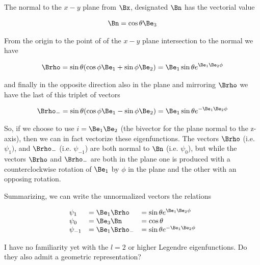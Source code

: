 The normal to the $x-y$ plane from $\Bx$, designated $\Bn$ has the vectorial value

\begin{align}\label{eqn:foo3}
\Bn = \cos\theta \Be_3 
\end{align}

From the origin to the point of of the $x-y$ plane intersection to the normal we have

\begin{align}\label{eqn:foo4}
\Brho = \sin\theta (\cos\phi \Be_1 + \sin\phi \Be_2) = \Be_1 \sin\theta e^{\Be_1 \Be_2 \phi}
\end{align}

and finally in the opposite direction also in the plane and mirroring $\Brho$ we have the last of this triplet of vectors

\begin{align}\label{eqn:foo5}
\Brho_{-} = \sin\theta (\cos\phi \Be_1 - \sin\phi \Be_2) = \Be_1 \sin\theta e^{-\Be_1 \Be_2 \phi}
\end{align}

So, if we choose to use $i=\Be_1 \Be_2$ (the bivector for the plane normal to the z-axis), then we can in fact vectorize these eigenfunctions.  The vectors $\Brho$ (i.e. $\psi_1)$, and $\Brho_{-}$ (i.e. $\psi_{-1}$) are both normal to $\Bn$ (i.e. $\psi_0$), but while the vectors $\Brho$ and $\Brho_{-}$ are both in the plane one is produced with a counterclockwise rotation of $\Be_1$ by $\phi$ in the plane and the other with an opposing rotation.

Summarizing, we can write the unnormalized vectors the relations

\begin{equation*}
\begin{array}{l l l}%
\psi_1 &= \Be_1 \Brho &= \sin\theta e^{\Be_1\Be_2 \phi} \\
\psi_0 &= \Be_3 \Bn &= \cos\theta \\
\psi_{-1} &= \Be_1 \Brho_{-} &= \sin\theta e^{-\Be_1\Be_2 \phi}
\end{array}
\end{equation*}


I have no familiarity yet with the $l=2$ or higher Legendre eigenfunctions.  Do they also admit a geometric representation?

\EndArticle
